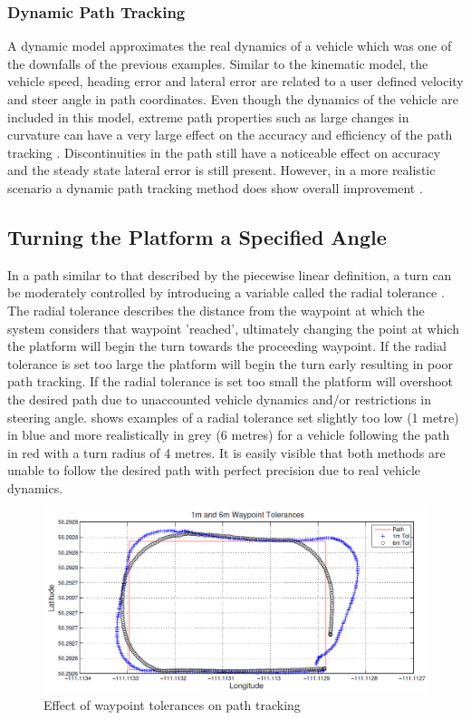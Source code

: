 \documentclass[main.tex]{subfiles}
\begin{document}
\subsubsection{Dynamic Path Tracking}
A dynamic model approximates the real dynamics of a vehicle which was one of the downfalls of the previous examples. Similar to the kinematic model, the vehicle speed, heading error and lateral error are related to a user defined velocity and steer angle in path coordinates. Even though the dynamics of the vehicle are included in this model, extreme path properties such as large changes in curvature can have a very large effect on the accuracy and efficiency of the path tracking \parencite{snider2009}. Discontinuities in the path still have a noticeable effect on accuracy and the steady state lateral error is still present. However, in a more realistic scenario a dynamic path tracking method does show overall improvement \parencite{snider2009}.

\subsection{Turning the Platform a Specified Angle}
In a path similar to that described by the piecewise linear definition, a turn can be moderately controlled by introducing a variable called the radial tolerance \parencite{Giesbrecht2005}. The radial tolerance describes the distance from the waypoint at which the system considers that waypoint 'reached', ultimately changing the point at which the platform will begin the turn towards the proceeding waypoint. If the radial tolerance is set too large the platform will begin the turn early resulting in poor path tracking. If the radial tolerance is set too small the platform will overshoot the desired path due to unaccounted vehicle dynamics and/or restrictions in steering angle.  shows examples of a radial tolerance set slightly too low (1 metre) in blue and more realistically in grey (6 metres) for a vehicle following the path in red with a turn radius of 4 metres. It is easily visible that both methods are unable to follow the desired path with perfect precision due to real vehicle dynamics.
\begin{figure}[ht]
\includegraphics[width=\textwidth]{3-LiteratureReview/waypointTolerances.PNG}
\centering
\caption[Effect of waypoint tolerances on path tracking]{Effect of waypoint tolerances on path tracking \parencite{Giesbrecht2005}} 
\end{figure}
\end{document}
